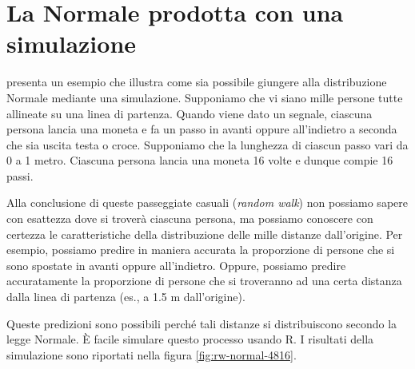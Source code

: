 \documentclass[
  11pt,
]{krantz}
\newcommand{\R}{\textsf{R}} %
\theoremstyle{definition}
\theoremstyle{definition}
\theoremstyle{definition}
\theoremstyle{definition}
\theoremstyle{remark}
\begin{document}
\hypertarget{normal-random-walk}{%
\section{La Normale prodotta con una simulazione}\label{normal-random-walk}}

\citet{McElreath_rethinking} presenta un esempio che illustra come sia possibile giungere alla distribuzione Normale mediante una simulazione. Supponiamo che vi siano mille persone tutte allineate su una linea di partenza. Quando viene dato un segnale, ciascuna persona lancia una moneta e fa un passo in avanti oppure all'indietro a seconda che sia uscita testa o croce. Supponiamo che la lunghezza di ciascun passo vari da 0 a 1 metro. Ciascuna persona lancia una moneta 16 volte e dunque compie 16 passi.

Alla conclusione di queste passeggiate casuali (\emph{random walk}) non possiamo sapere con esattezza dove si troverà ciascuna persona, ma possiamo conoscere con certezza le caratteristiche della distribuzione delle mille distanze dall'origine. Per esempio, possiamo predire in maniera accurata la proporzione di persone che si sono spostate in avanti oppure all'indietro. Oppure, possiamo predire accuratamente la proporzione di persone che si troveranno ad una certa distanza dalla linea di partenza (es., a 1.5 m dall'origine).

Queste predizioni sono possibili perché tali distanze si distribuiscono secondo la legge Normale. È facile simulare questo processo usando \R. I risultati della simulazione sono riportati nella figura \ref{fig:rw-normal-4816}.
\end{document}
